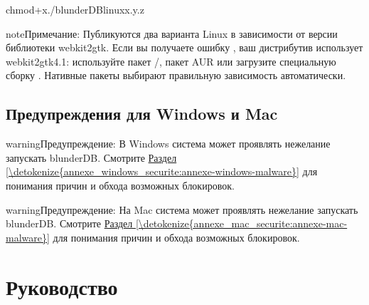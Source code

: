 \documentclass[letterpaper,10pt,russian]{sphinxmanual}
\begin{document}
\begin{sphinxVerbatim}[commandchars=\\\{\}]
chmod+x./blunderDB\PYGZhy{}linux\PYGZhy{}x.y.z
\end{sphinxVerbatim}

\begin{sphinxadmonition}{note}{Примечание:}
\sphinxAtStartPar
Публикуются два варианта Linux в зависимости от версии библиотеки webkit2gtk. Если вы получаете ошибку , ваш дистрибутив использует webkit2gtk\sphinxhyphen{}4.1: используйте пакет /, пакет AUR или загрузите специальную сборку . Нативные пакеты выбирают правильную зависимость автоматически.
\end{sphinxadmonition}


\subsection{Предупреждения для Windows и Mac}
\label{\detokenize{telecharge_install:avertissements-windows-et-mac}}
\begin{sphinxadmonition}{warning}{Предупреждение:}
\sphinxAtStartPar
В Windows система может проявлять нежелание запускать blunderDB. Смотрите \hyperref[\detokenize{annexe_windows_securite:annexe-windows-malware}]{Раздел \ref{\detokenize{annexe_windows_securite:annexe-windows-malware}}} для понимания причин и обхода возможных блокировок.
\end{sphinxadmonition}

\begin{sphinxadmonition}{warning}{Предупреждение:}
\sphinxAtStartPar
На Mac система может проявлять нежелание запускать blunderDB. Смотрите \hyperref[\detokenize{annexe_mac_securite:annexe-mac-malware}]{Раздел \ref{\detokenize{annexe_mac_securite:annexe-mac-malware}}} для понимания причин и обхода возможных блокировок.
\end{sphinxadmonition}

\sphinxstepscope


\section{Руководство}
\label{\detokenize{manuel:manuel}}\label{\detokenize{manuel:id1}}\label{\detokenize{manuel::doc}}
\end{document}
